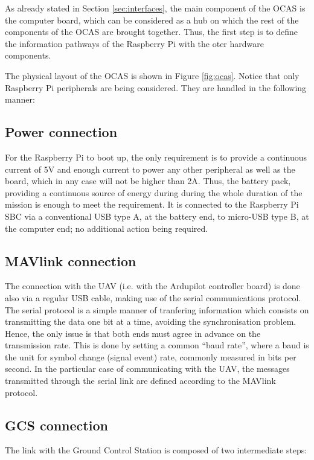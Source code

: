 As already stated in Section \ref{sec:interfaces}, the main component of the OCAS is the computer board, which can be considered as a hub on which the rest of the components of the OCAS are brought together.
Thus, the first step is to define the information pathways of the Raspberry Pi with the oter hardware components.

The physical layout of the OCAS is shown in Figure \ref{fig:ocas}. 
Notice that only Raspberry Pi peripherals are being considered. 
They are handled in the following manner:



\subsection{Power connection}
For the Raspberry Pi to boot up, the only requirement is to provide a continuous current of 5V and enough current to power any other peripheral as well as the board, which in any case will not be higher than 2A.
Thus, the battery pack, providing a continuous source of energy during during the whole duration of the mission is enough to meet the requirement.
It is connected to the Raspberry Pi SBC via a conventional USB type A, at the battery end, to micro-USB type B, at the computer end; no additional action being required.

\subsection{MAVlink connection}
The connection with the UAV (i.e. with the Ardupilot controller board) is done also via a regular USB cable, making use of the serial communications protocol.
The serial protocol is a simple manner of tranfering information which consists on transmitting the data one bit at a time, avoiding the synchronisation problem.
Hence, the only issue is that both ends must agree in advance on the transmission rate.
This is done by setting a common ``baud rate'', where a baud is the unit for symbol change (signal event) rate, commonly measured in bits per second.
In the particular case of communicating with the UAV, the messages transmitted through the serial link are defined according to the MAVlink protocol.

\subsection{GCS connection}
The link with the Ground Control Station is composed of two intermediate steps:

